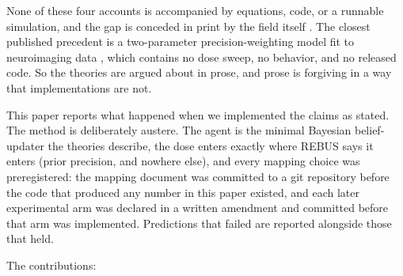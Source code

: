 \documentclass[11pt]{article}
\begin{document}
None of these four accounts is accompanied by equations, code, or a runnable
simulation, and the gap is conceded in print by the field itself \cite{mago2026}. The
closest published precedent is a two-parameter precision-weighting model fit to
neuroimaging data \cite{rajpal2022}, which contains no dose sweep, no behavior, and no
released code. So the theories are argued about in prose, and prose is forgiving in a
way that implementations are not.

This paper reports what happened when we implemented the claims as stated. The method
is deliberately austere. The agent is the minimal Bayesian belief-updater the theories
describe, the dose enters exactly where REBUS says it enters (prior precision, and
nowhere else), and every mapping choice was preregistered: the mapping document was
committed to a git repository before the code that produced any number in this paper
existed, and each later experimental arm was declared in a written amendment and
committed before that arm was implemented. Predictions that failed are reported
alongside those that held.

The contributions:
\end{document}
